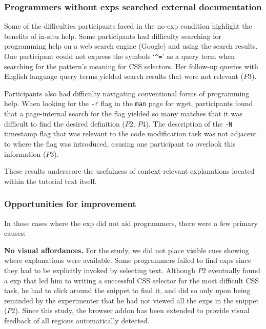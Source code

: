 \subsubsection{Programmers without \glspl{exp} searched external documentation}

Some of the difficulties participants faced in the no-\gls{exp} condition  highlight the benefits of in-situ help.
Some participants had difficulty searching for programming help on a web search engine (Google) and using the search results.
One participant could not express the symbols `\texttt{\^{}=}' as a query term when searching for the pattern's meaning for CSS selectors.
Her follow-up queries with English language query terms  yielded search results that were not relevant ($P3$).

Participants also had difficulty navigating conventional forms of programming help.
When looking for the \texttt{-r} flag in the \texttt{man} page for wget, participants found that a page-internal search for the flag yielded so many matches that it was difficult to find the desired definition ($P2$, $P4$).
The description of the \texttt{-N} timestamp flag that was relevant to the code modification task was not adjacent to where the flag was introduced, causing one participant to overlook this information ($P3$).

These results underscore the usefulness of context-relevant explanations located within the tutorial text itself.

\subsubsection{Opportunities for improvement}
In those cases where the \gls{exp} did not aid programmers, there were a few primary causes:

{\bf No visual affordances.} For the study, we did not place visible cues showing where explanations were available.
Some programmers failed to find \glspl{exp} since they had to be explicitly invoked by selecting text.
Although $P2$ eventually found a \gls{exp} that led him to writing a successful CSS selector for the most difficult CSS task, he had to click around the snippet to find it, and did so only upon being reminded by the experimenter that he had not viewed all the \glspl{exp} in the snippet ($P2$).
\fi
Since this study, the browser addon has been extended to provide visual feedback of all regions automatically detected.

